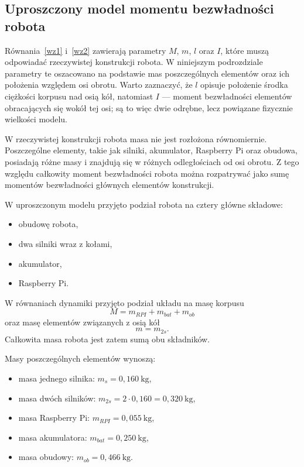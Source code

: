 \documentclass[12pt,twoside]{article}
\begin{document}
\subsection{Uproszczony model momentu bezwładności robota}

Równania~\eqref{wz1} i~\eqref{wz2} zawierają parametry $M$, $m$, $l$ oraz $I$, które muszą odpowiadać rzeczywistej konstrukcji robota. W niniejszym podrozdziale parametry te oszacowano na podstawie mas poszczególnych elementów oraz ich położenia względem osi obrotu. Warto zaznaczyć, że $l$ opisuje położenie środka ciężkości korpusu nad osią kół, natomiast $I$ --- moment bezwładności elementów obracających się wokół tej osi; są to więc dwie odrębne, lecz powiązane fizycznie wielkości modelu.

W rzeczywistej konstrukcji robota masa nie jest rozłożona równomiernie.
Poszczególne elementy, takie jak silniki, akumulator, Raspberry Pi oraz
obudowa, posiadają różne masy i znajdują się w różnych odległościach od osi
obrotu. Z tego względu całkowity moment bezwładności robota można
rozpatrywać jako sumę momentów bezwładności głównych elementów konstrukcji.

W uproszczonym modelu przyjęto podział robota na cztery główne składowe:

\begin{itemize}
    \item obudowę robota,
    \item dwa silniki wraz z kołami,
    \item akumulator,
    \item Raspberry Pi.
\end{itemize}

W równaniach dynamiki przyjęto podział układu na masę korpusu
\[
M = m_{RPI} + m_{bat} + m_{ob}
\]
oraz masę elementów związanych z osią kół
\[
m = m_{2s}.
\]
Całkowita masa robota jest zatem sumą obu składników.

Masy poszczególnych elementów wynoszą:

\begin{itemize}
    \item masa jednego silnika: $m_s = 0{,}160 \ \text{kg}$,
    \item masa dwóch silników: $m_{2s} = 2 \cdot 0{,}160 = 0{,}320 \ \text{kg}$,
    \item masa Raspberry Pi: $m_{RPI} = 0{,}055 \ \text{kg}$,
    \item masa akumulatora: $m_{bat} = 0{,}250 \ \text{kg}$,
    \item masa obudowy: $m_{ob} = 0{,}466 \ \text{kg}$.
\end{itemize}
\end{document}
